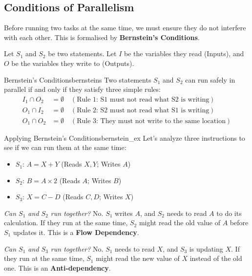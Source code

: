 \documentclass[11pt,a4paper]{article}
\begin{document}
\subsection{Conditions of Parallelism}
Before running two tasks at the same time, we must ensure they do not interfere with each other. This is formalised by \textbf{Bernstein's Conditions}.

Let $S_1$ and $S_2$ be two statements. Let $I$ be the variables they read (Inputs), and $O$ be the variables they write to (Outputs).

\begin{theorem}{Bernstein's Conditions}{bernsteins}
Two statements $S_1$ and $S_2$ can run safely in parallel if and only if they satisfy three simple rules:
\begin{align}
    I_1 \cap O_2 &= \emptyset \quad (\text{Rule 1: S1 must not read what S2 is writing}) \\
    O_1 \cap I_2 &= \emptyset \quad (\text{Rule 2: S2 must not read what S1 is writing}) \\
    O_1 \cap O_2 &= \emptyset \quad (\text{Rule 3: They must not write to the same location})
\end{align}
\end{theorem}

\begin{example}{Applying Bernstein's Conditions}{bernstein_ex}
Let's analyze three instructions to see if we can run them at the same time:
\begin{itemize}
    \item $S_1$: $A = X + Y$ \hfill (Reads $X, Y$; Writes $A$)
    \item $S_2$: $B = A \times 2$ \hfill (Reads $A$; Writes $B$)
    \item $S_3$: $X = C - D$ \hfill (Reads $C, D$; Writes $X$)
\end{itemize}

\textit{Can $S_1$ and $S_2$ run together?} 
No. $S_1$ writes $A$, and $S_2$ needs to read $A$ to do its calculation. If they run at the same time, $S_2$ might read the old value of $A$ before $S_1$ updates it. This is a \textbf{Flow Dependency}.

\textit{Can $S_1$ and $S_3$ run together?} 
No. $S_1$ needs to read $X$, and $S_3$ is updating $X$. If they run at the same time, $S_1$ might read the new value of $X$ instead of the old one. This is an \textbf{Anti-dependency}.
\end{example}
\end{document}
